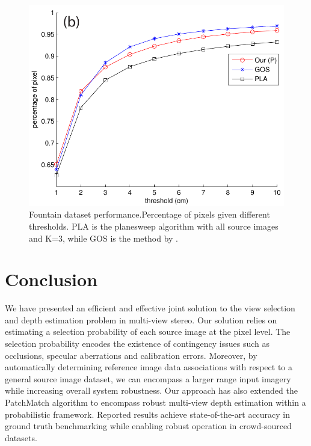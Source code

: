 \begin{figure}
\centering
\centering
\includegraphics[width=0.60\linewidth]{chapter3/resource/compareGoesele.pdf}
\caption{Fountain dataset performance.Percentage of pixels given different thresholds.  PLA is the planesweep algorithm with all source images and K=3, while GOS is the method by \citet{Goesele07}.}
\label{fig:compareGoesele}
\end{figure}


\section{Conclusion}
We have presented an efficient and effective joint solution to the view selection and depth estimation problem in multi-view stereo. Our solution relies on estimating a selection probability of each source image at the pixel level. The selection probability encodes the existence of contingency issues such as occlusions, specular aberrations and calibration errors. Moreover, by automatically determining reference image data associations with respect to a general source image dataset, we can encompass a larger range input imagery while increasing overall system robustness. Our approach has also extended the PatchMatch algorithm to encompass robust multi-view depth estimation within a probabilistic framework. Reported results achieve state-of-the-art accuracy in ground truth benchmarking while enabling robust operation in crowd-sourced datasets. 


